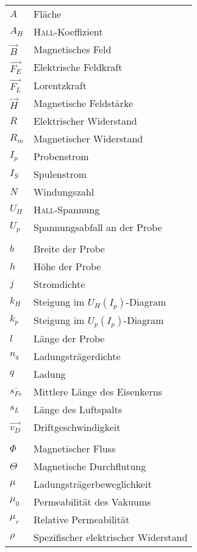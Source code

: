 
\begin{table}[h]
    \begin{tabular}{@{}ll@{}}
        $A$ & Fläche \\
        $A_H$ & \textsc{Hall}-Koeffizient\\
        $\vec{B}$           & Magnetisches Feld \\
        $\vec{F_E}$           & Elektrische Feldkraft \\
        $\vec{F_L}$           & Lorentzkraft \\
        $\vec{H}$ & Magnetische Feldstärke \\
        $R$ & Elektrischer Widerstand \\
        $R_m$ & Magnetischer Widerstand \\
        $I_p$  & Probenstrom \\
        $I_S$  & Spulenstrom \\
        $N$ & Windungszahl \\
        $U_H$  & \textsc{Hall}-Spannung \\
        $U_p$  & Spannungsabfall an der Probe \\
        & \\
        $b$           & Breite der Probe \\
        $h$           & Höhe der Probe \\
        $j$ & Stromdichte \\
        $k_H$ & Steigung im \(U_H(I_p)\)-Diagram \\
        $k_p$ & Steigung im \(U_p(I_p)\)-Diagram \\
        $l$           & Länge der Probe \\
        $n_q$ & Ladungsträgerdichte \\
        $q$           & Ladung \\
        $\bar{s_{Fe}}$ & Mittlere Länge des Eisenkerns \\
        $s_L$ & Länge des Luftspalts \\
        $\vec{v_D}$           & Driftgeschwindigkeit \\
        & \\
        $\Phi$ & Magnetischer Fluss \\
        $\Theta$ & Magnetische Durchflutung \\
        $\mu$ & Ladungsträgerbeweglichkeit \\
        $\mu_0$ & Permeabilität des Vakuums \\
        $\mu_r$ & Relative Permeabilität \\
        $\rho$ & Spezifischer elektrischer Widerstand \\
    \end{tabular}
\end{table}